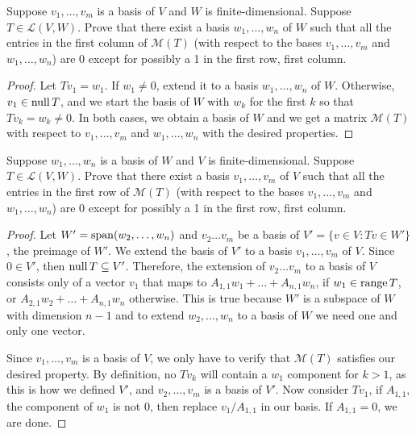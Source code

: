 \begin{exercise}{4}
 Suppose $v_{1},\dots, v_{m}$ is a basis of $V$ and $W$ is finite-dimensional. Suppose $T\in\mathcal{L}(V,W)$. Prove that there exist a basis $w_{1},\dots,w_{n}$ of $W$ such that all the entries in the first column of $\mathcal{M}(T)$ (with respect to the bases $v_{1},\dots, v_{m}$ and $w_{1},\dots,w_{n}$) are 0 except for possibly a 1 in the first row, first column.
\end{exercise}
\begin{proof}
 Let $Tv_{1}=w_{1}$. If $w_{1}\neq0$, extend it to a basis $w_{1},\dots,w_{n}$ of $W$. Otherwise, $v_{1}\in\operatorname*{null} T$, and we start the basis of $W$ with $w_{k}$ for the first $k$ so that $Tv_{k}=w_{k}\neq0$. In both cases, we obtain a basis of $W$ and we get a matrix $\mathcal{M}(T)$ with respect to $v_{1},\dots,v_{m}$ and $w_{1},\dots,w_{n}$ with the desired properties.
\end{proof}


\begin{exercise}{5}
 Suppose $w_{1},\dots,w_{n}$ is a basis of $W$ and $V$ is finite-dimensional. Suppose $T\in\mathcal{L}(V,W)$. Prove that there exist a basis $v_{1},\dots, v_{m}$ of $V$ such that all the entries in the first row of $\mathcal{M}(T)$ (with respect to the bases $v_{1},\dots, v_{m}$ and $w_{1},\dots,w_{n}$) are 0 except for possibly a 1 in the first row, first column.
\end{exercise}
\begin{proof}
 Let $W'=\operatorname*{span}(w_{2},\dots,w_{n})$ and $v_{2}\dots v_{m}$ be a basis of $V'=\{v\in V: Tv\in W'\}$, the preimage of $W'$. We extend the basis of $V'$ to a basis $v_{1},\dots,v_{m}$ of $V$. Since $0\in V'$, then $\operatorname*{null} T\subseteq V'$. Therefore, the extension of $v_{2}\dots v_{m}$ to a basis of $V$ consists only of a vector $v_{1}$ that maps to $A_{1,1}w_{1}+\dots+A_{n,1}w_{n}$, if $w_{1}\in\operatorname*{range} T$, or $A_{2,1}w_{2}+\dots+A_{n,1}w_{n}$ otherwise. This is true because $W'$ is a subspace of $W$ with dimension $n-1$ and to extend $w_{2},\dots,w_{n}$ to a basis of $W$ we need one and only one vector.
 
 Since $v_{1},\dots,v_{m}$ is a basis of $V$, we only have to verify that $\mathcal{M}(T)$ satisfies our desired property. By definition, no $Tv_{k}$ will contain a $w_{1}$ component for $k>1$, as this is how we defined $V'$, and $v_{2},\dots,v_{m}$ is a basis of $V'$. Now consider $Tv_{1}$, if $A_{1,1}$, the component of $w_{1}$ is not 0, then replace $v_{1}/A_{1,1}$ in our basis. If $A_{1,1}=0$, we are done.
\end{proof}


